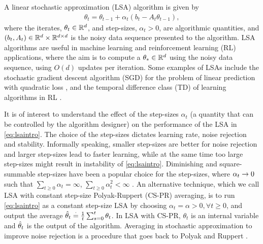 A linear stochastic approximation (LSA) algorithm is given by
\begin{align}\label{eq:lsaintro}
\theta_t=\theta_{t-1}+\alpha_t (b_t-A_t \theta_{t-1}),
\end{align}
where the iterates, $\theta_t\in \mathbb{R}^d$, and step-sizes, $\alpha_t>0$, are algorithmic quantities, and $(b_t,A_t)\in \mathbb{R}^d\times \mathbb{R}^{d \times d}$ is the noisy data sequence presented to the algorithm.
LSA algorithms are useful in machine learning and reinforcement learning (RL) applications, where the aim is to compute a $\theta_*\in \mathbb{R}^d$ using the noisy data sequence, using $O(d)$ updates per iteration. Some examples of LSAs include the stochastic gradient descent algorithm (SGD) for the problem of linear prediction with quadratic loss \cite{bach,bachaistats}, and the temporal difference class (TD) of learning algorithms in RL \cite{sutton,konda-tsitsiklis,gtd,gtd2,gtdmp}.\par
It is of interest to understand the effect of the step-sizes $\alpha_t$ (a quantity that can be controlled by the algorithm designer) on the performance of the LSA in \eqref{eq:lsaintro}. The choice of the step-sizes dictates learning rate, noise rejection and stability. Informally speaking, smaller step-sizes are better for noise rejection and larger step-sizes lead to faster learning, while at the same time too large step-sizes might result in instability of \eqref{eq:lsaintro}. Diminishing and square-summable step-sizes have been a popular choice for the step-sizes, where $\alpha_t\rightarrow 0$ such that $\sum_{t\geq 0} \alpha_t=\infty$, $\sum_{t\geq 0}\alpha^2_t<\infty$ \cite{gtd2,borkarbook,konda-tsitsiklis}. An alternative technique, which we call LSA with constant step-size Polyak-Ruppert (CS-PR) averaging, is to run \eqref{eq:lsaintro} as a constant step-size LSA by choosing $\alpha_t=\alpha>0,\forall t\geq 0$, and output the average $\hat{\theta}_t\stackrel{\cdot}{=}\frac{1}{t}\sum_{s=0}^t \theta_t$. In LSA with CS-PR, $\theta_t$ is an internal variable and $\hat{\theta}_t$ is the output of the algorithm.
Averaging in stochastic approximation to improve noise rejection is a procedure that goes back to  Polyak and Ruppert \cite{polyak-judisky,ruppert}.
